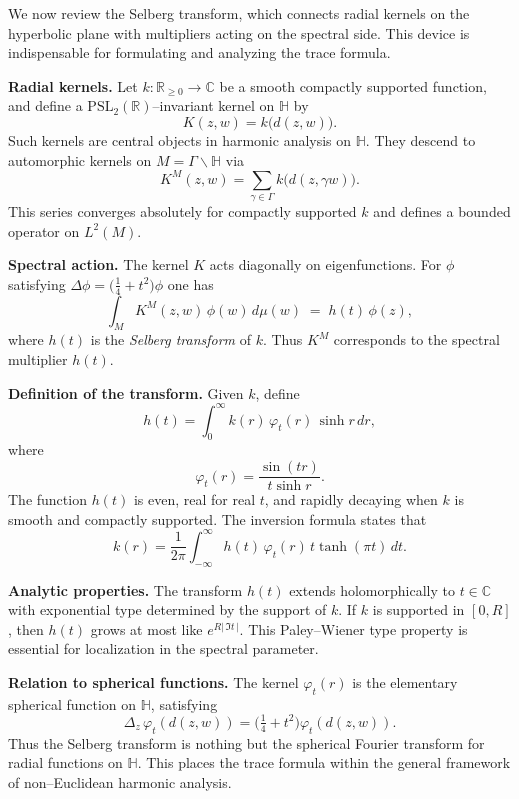 
We now review the Selberg transform, which connects radial kernels on
the hyperbolic plane with multipliers acting on the spectral side.
This device is indispensable for formulating and analyzing the trace formula.

\medskip
\noindent\textbf{Radial kernels.}
Let $k:\mathbb{R}_{\ge0}\to\mathbb{C}$ be a smooth compactly supported function,
and define a $\mathrm{PSL}_{2}(\mathbb{R})$–invariant kernel on $\mathbb{H}$ by
\[
  K(z,w) = k\!\big(d(z,w)\big).
\]
Such kernels are central objects in harmonic analysis on $\mathbb{H}$.
They descend to automorphic kernels on $M=\Gamma\backslash\mathbb{H}$ via
\[
  K^{M}(z,w) = \sum_{\gamma\in\Gamma} k\!\big(d(z,\gamma w)\big).
\]
This series converges absolutely for compactly supported $k$ and defines a bounded
operator on $L^{2}(M)$.

\medskip
\noindent\textbf{Spectral action.}
The kernel $K$ acts diagonally on eigenfunctions.
For $\phi$ satisfying $\Delta\phi=\big(\tfrac14+t^{2}\big)\phi$ one has
\[
  \int_{M} K^{M}(z,w)\,\phi(w)\,d\mu(w)
  \;=\; h(t)\,\phi(z),
\]
where $h(t)$ is the \emph{Selberg transform} of $k$.
Thus $K^{M}$ corresponds to the spectral multiplier $h(t)$.

\medskip
\noindent\textbf{Definition of the transform.}
Given $k$, define
\[
  h(t) = \int_{0}^{\infty} k(r)\,\varphi_{t}(r)\,\sinh r\,dr,
\]
where
\[
  \varphi_{t}(r) = \frac{\sin(t r)}{t\sinh r}.
\]
The function $h(t)$ is even, real for real $t$, and rapidly decaying when $k$
is smooth and compactly supported.
The inversion formula states that
\[
  k(r) = \frac{1}{2\pi}\int_{-\infty}^{\infty} h(t)\,\varphi_{t}(r)\,t\tanh(\pi t)\,dt.
\]

\medskip
\noindent\textbf{Analytic properties.}
The transform $h(t)$ extends holomorphically to $t\in\mathbb{C}$
with exponential type determined by the support of $k$.
If $k$ is supported in $[0,R]$, then $h(t)$ grows at most like $e^{R|\,\Im t\,|}$.
This Paley–Wiener type property is essential for localization in the spectral parameter.

\medskip
\noindent\textbf{Relation to spherical functions.}
The kernel $\varphi_{t}(r)$ is the elementary spherical function on $\mathbb{H}$,
satisfying
\[
  \Delta_{z}\,\varphi_{t}(d(z,w)) = \Big(\tfrac14+t^{2}\Big)\varphi_{t}(d(z,w)).
\]
Thus the Selberg transform is nothing but the spherical Fourier transform
for radial functions on $\mathbb{H}$.
This places the trace formula within the general framework of non–Euclidean
harmonic analysis.

